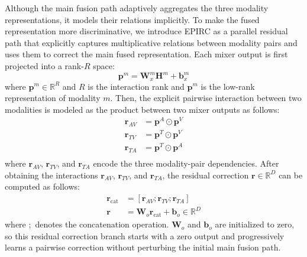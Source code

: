 \documentclass[letterpaper]{article} %
\begin{document}
Although the main fusion path adaptively aggregates the three modality
representations, it models their relations implicitly. To make the fused representation more discriminative, we introduce EPIRC as a parallel residual path that explicitly captures
multiplicative relations between modality pairs and uses them to correct the main fused representation. Each mixer output is first projected into a rank-$R$ space:
\begin{equation}
\mathbf{p}^{m}
=\mathbf{W}_{x}^{m}\mathbf{H}^{m}
+\mathbf{b}_{x}^{m}
\end{equation}
where $\mathbf{p}^{m}\in\mathbb{R}^{R}$ and $R$ is the interaction rank and $\mathbf{p}^{m}$ is the low-rank representation of modality $m$. Then, the explicit pairwise
interaction between two modalities is modeled as the product between two mixer outputs as follows:
\begin{equation}
\begin{aligned}
\mathbf{r}_{AV}&=\mathbf{p}^{A}\odot\mathbf{p}^{V}\\
\mathbf{r}_{TV}&=\mathbf{p}^{T}\odot\mathbf{p}^{V}\\
\mathbf{r}_{TA}&=\mathbf{p}^{T}\odot\mathbf{p}^{A}\\
\end{aligned}
\label{eq:pairwise_interact}
\end{equation}
where $\mathbf{r}_{AV}$, $\mathbf{r}_{TV}$, and $\mathbf{r}_{TA}$ encode the three modality-pair dependencies. After obtaining the interactions $\mathbf{r}_{AV}$, $\mathbf{r}_{TV}$, and $\mathbf{r}_{TA}$, the residual correction $\mathbf{r}\in\mathbb{R}^{D}$ can be computed as follows:
\begin{equation}
\begin{aligned}
\mathbf{r}_{\mathrm{cat}} &=[\mathbf{r}_{AV};\mathbf{r}_{TV};\mathbf{r}_{TA}]\\
\mathbf{r}&=\mathbf{W}_{o}\mathbf{r}_{\mathrm{cat}}
  +\mathbf{b}_{o}\in\mathbb{R}^{D}
\end{aligned}
\label{eq:pairwise_residual}
\end{equation}
where $;$ denotes the concatenation operation. $\mathbf{W}_{o}$ and $\mathbf{b}_{o}$ are initialized to zero, so this residual correction branch starts with a zero output and progressively learns a pairwise correction without perturbing the initial main fusion path.
\end{document}
